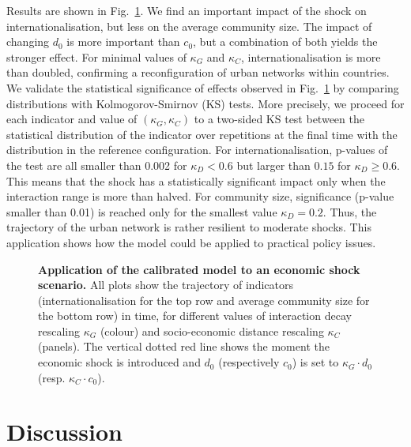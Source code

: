 \documentclass[10pt,letterpaper]{article}
\begin{document}
Results are shown in Fig.~\ref{fig:fig9}. We find an important impact of the shock on internationalisation, but less on the average community size. The impact of changing $d_0$ is more important than $c_0$, but a combination of both yields the stronger effect. For minimal values of $\kappa_G$ and $\kappa_C$, internationalisation is more than doubled, confirming a reconfiguration of urban networks within countries. We validate the statistical significance of effects observed in Fig.~\ref{fig:fig9} by comparing distributions with Kolmogorov-Smirnov (KS) tests. More precisely, we proceed for each indicator and value of $(\kappa_G,\kappa_C)$ to a two-sided KS test between the statistical distribution of the indicator over repetitions at the final time with the distribution in the reference configuration. For internationalisation, p-values of the test are all smaller than 0.002 for $\kappa_D < 0.6$ but larger than $0.15$ for $\kappa_D \geq 0.6$. This means that the shock has a statistically significant impact only when the interaction range is more than halved. For community size, significance (p-value smaller than 0.01) is reached only for the smallest value $\kappa_D = 0.2$. Thus, the trajectory of the urban network is rather resilient to moderate shocks. This application shows how the model could be applied to practical policy issues.


\begin{figure}
	\begin{center}
    \end{center}
	\caption{\textbf{Application of the calibrated model to an economic shock scenario.} All plots show the trajectory of indicators (internationalisation for the top row and average community size for the bottom row) in time, for different values of interaction decay rescaling $\kappa_G$ (colour) and socio-economic distance rescaling $\kappa_C$ (panels). The vertical dotted red line shows the moment the economic shock is introduced and $d_0$ (respectively $c_0$) is set to $\kappa_G \cdot d_0$ (resp. $\kappa_C \cdot c_0$).\label{fig:fig9}}
\end{figure}



\section*{Discussion}
\end{document}
